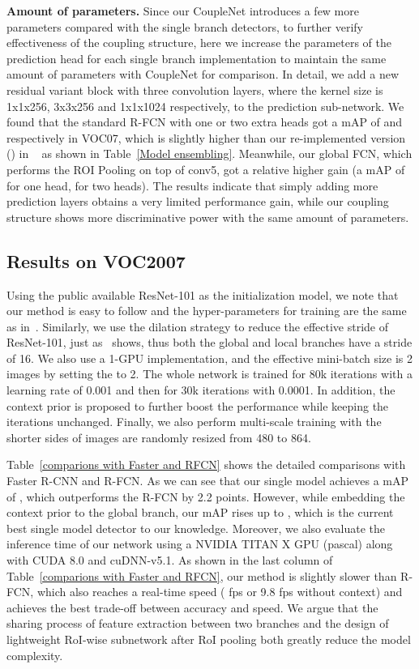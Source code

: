 \documentclass[10pt,twocolumn,letterpaper]{article}
\begin{document}
\textbf{Amount of parameters.} Since our CoupleNet introduces a few more parameters compared with the single branch detectors, to further verify effectiveness of the coupling structure, here we increase the parameters of the prediction head for each single branch implementation to maintain the same amount of parameters with CoupleNet for comparison. In detail, we add a new residual variant block with three convolution layers, where the kernel size is 1x1x256, 3x3x256 and 1x1x1024 respectively, to the prediction sub-network. We found that the standard R-FCN with one or two extra heads got a mAP of  and  respectively in VOC07, which is slightly higher than our re-implemented version () in ~\cite{li2016r} as shown in Table~\ref{Model ensembling}. Meanwhile, our global FCN, which performs the ROI Pooling on top of conv5, got a relative higher gain (a mAP of  for one head,  for two heads). The results indicate that simply adding more prediction layers obtains a very limited performance gain, while our coupling structure shows more discriminative power with the same amount of parameters.

\subsection{Results on VOC2007}
Using the public available ResNet-101 as the initialization model, we note that our method is easy to follow and the hyper-parameters for training are the same as in~\cite{li2016r}. Similarly, we use the dilation strategy to reduce the effective stride of ResNet-101, just as~\cite{li2016r} shows, thus both the global and local branches have a stride of 16. We also use a 1-GPU implementation, and the effective mini-batch size is 2 images by setting the  to 2. The whole network is trained for 80k iterations with a learning rate of 0.001 and then for 30k iterations with 0.0001. In addition, the context prior is proposed to further boost the performance while keeping the iterations unchanged. Finally, we also perform multi-scale training with the shorter sides of images are randomly resized from 480 to 864.

Table~\ref{comparions with Faster and RFCN} shows the detailed comparisons with Faster R-CNN and R-FCN. As we can see that our single model achieves a mAP of , which outperforms the R-FCN by 2.2 points. However, while embedding the context prior to the global branch, our mAP rises up to , which is the current best single model detector to our knowledge. Moreover, we also evaluate the inference time of our network using a NVIDIA TITAN X GPU (pascal) along with CUDA 8.0 and cuDNN-v5.1. As shown in the last column of Table~\ref{comparions with Faster and RFCN}, our method is slightly slower than R-FCN, which also reaches a real-time speed ( fps or 9.8 fps without context) and achieves the best trade-off between accuracy and speed. We argue that the sharing process of feature extraction between two branches and the design of lightweight RoI-wise subnetwork after RoI pooling both greatly reduce the model complexity.
\end{document}
